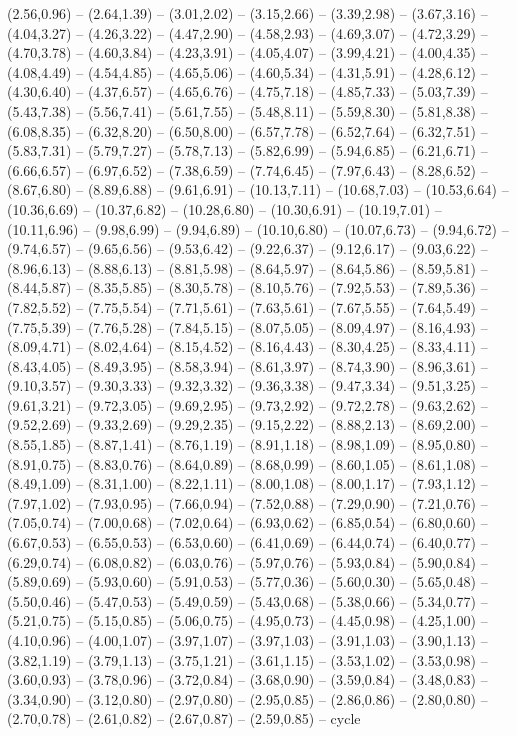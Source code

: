 \expandafter\def\csname geo:Hoehe:300\endcsname{
  (2.56,0.96) -- (2.64,1.39) -- (3.01,2.02) -- (3.15,2.66) -- (3.39,2.98) -- (3.67,3.16) -- (4.04,3.27) -- (4.26,3.22) -- (4.47,2.90) -- (4.58,2.93) -- (4.69,3.07) -- (4.72,3.29) -- (4.70,3.78) -- (4.60,3.84) -- (4.23,3.91) -- (4.05,4.07) -- (3.99,4.21) -- (4.00,4.35) -- (4.08,4.49) -- (4.54,4.85) -- (4.65,5.06) -- (4.60,5.34) -- (4.31,5.91) -- (4.28,6.12) -- (4.30,6.40) -- (4.37,6.57) -- (4.65,6.76) -- (4.75,7.18) -- (4.85,7.33) -- (5.03,7.39) -- (5.43,7.38) -- (5.56,7.41) -- (5.61,7.55) -- (5.48,8.11) -- (5.59,8.30) -- (5.81,8.38) -- (6.08,8.35) -- (6.32,8.20) -- (6.50,8.00) -- (6.57,7.78) -- (6.52,7.64) -- (6.32,7.51) -- (5.83,7.31) -- (5.79,7.27) -- (5.78,7.13) -- (5.82,6.99) -- (5.94,6.85) -- (6.21,6.71) -- (6.66,6.57) -- (6.97,6.52) -- (7.38,6.59) -- (7.74,6.45) -- (7.97,6.43) -- (8.28,6.52) -- (8.67,6.80) -- (8.89,6.88) -- (9.61,6.91) -- (10.13,7.11) -- (10.68,7.03) -- (10.53,6.64) -- (10.36,6.69) -- (10.37,6.82) -- (10.28,6.80) -- (10.30,6.91) -- (10.19,7.01) -- (10.11,6.96) -- (9.98,6.99) -- (9.94,6.89) -- (10.10,6.80) -- (10.07,6.73) -- (9.94,6.72) -- (9.74,6.57) -- (9.65,6.56) -- (9.53,6.42) -- (9.22,6.37) -- (9.12,6.17) -- (9.03,6.22) -- (8.96,6.13) -- (8.88,6.13) -- (8.81,5.98) -- (8.64,5.97) -- (8.64,5.86) -- (8.59,5.81) -- (8.44,5.87) -- (8.35,5.85) -- (8.30,5.78) -- (8.10,5.76) -- (7.92,5.53) -- (7.89,5.36) -- (7.82,5.52) -- (7.75,5.54) -- (7.71,5.61) -- (7.63,5.61) -- (7.67,5.55) -- (7.64,5.49) -- (7.75,5.39) -- (7.76,5.28) -- (7.84,5.15) -- (8.07,5.05) -- (8.09,4.97) -- (8.16,4.93) -- (8.09,4.71) -- (8.02,4.64) -- (8.15,4.52) -- (8.16,4.43) -- (8.30,4.25) -- (8.33,4.11) -- (8.43,4.05) -- (8.49,3.95) -- (8.58,3.94) -- (8.61,3.97) -- (8.74,3.90) -- (8.96,3.61) -- (9.10,3.57) -- (9.30,3.33) -- (9.32,3.32) -- (9.36,3.38) -- (9.47,3.34) -- (9.51,3.25) -- (9.61,3.21) -- (9.72,3.05) -- (9.69,2.95) -- (9.73,2.92) -- (9.72,2.78) -- (9.63,2.62) -- (9.52,2.69) -- (9.33,2.69) -- (9.29,2.35) -- (9.15,2.22) -- (8.88,2.13) -- (8.69,2.00) -- (8.55,1.85) -- (8.87,1.41) -- (8.76,1.19) -- (8.91,1.18) -- (8.98,1.09) -- (8.95,0.80) -- (8.91,0.75) -- (8.83,0.76) -- (8.64,0.89) -- (8.68,0.99) -- (8.60,1.05) -- (8.61,1.08) -- (8.49,1.09) -- (8.31,1.00) -- (8.22,1.11) -- (8.00,1.08) -- (8.00,1.17) -- (7.93,1.12) -- (7.97,1.02) -- (7.93,0.95) -- (7.66,0.94) -- (7.52,0.88) -- (7.29,0.90) -- (7.21,0.76) -- (7.05,0.74) -- (7.00,0.68) -- (7.02,0.64) -- (6.93,0.62) -- (6.85,0.54) -- (6.80,0.60) -- (6.67,0.53) -- (6.55,0.53) -- (6.53,0.60) -- (6.41,0.69) -- (6.44,0.74) -- (6.40,0.77) -- (6.29,0.74) -- (6.08,0.82) -- (6.03,0.76) -- (5.97,0.76) -- (5.93,0.84) -- (5.90,0.84) -- (5.89,0.69) -- (5.93,0.60) -- (5.91,0.53) -- (5.77,0.36) -- (5.60,0.30) -- (5.65,0.48) -- (5.50,0.46) -- (5.47,0.53) -- (5.49,0.59) -- (5.43,0.68) -- (5.38,0.66) -- (5.34,0.77) -- (5.21,0.75) -- (5.15,0.85) -- (5.06,0.75) -- (4.95,0.73) -- (4.45,0.98) -- (4.25,1.00) -- (4.10,0.96) -- (4.00,1.07) -- (3.97,1.07) -- (3.97,1.03) -- (3.91,1.03) -- (3.90,1.13) -- (3.82,1.19) -- (3.79,1.13) -- (3.75,1.21) -- (3.61,1.15) -- (3.53,1.02) -- (3.53,0.98) -- (3.60,0.93) -- (3.78,0.96) -- (3.72,0.84) -- (3.68,0.90) -- (3.59,0.84) -- (3.48,0.83) -- (3.34,0.90) -- (3.12,0.80) -- (2.97,0.80) -- (2.95,0.85) -- (2.86,0.86) -- (2.80,0.80) -- (2.70,0.78) -- (2.61,0.82) -- (2.67,0.87) -- (2.59,0.85) -- cycle
}
